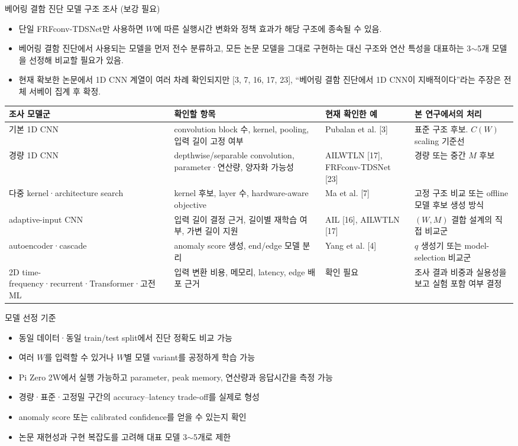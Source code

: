 \documentclass[10pt]{article}
\begin{document}
\noindent 베어링 결함 진단 모델 구조 조사 (보강 필요)
\begin{itemize}
\item 단일 FRFconv-TDSNet만 사용하면 $W$에 따른 실행시간 변화와 정책 효과가 해당 구조에 종속될 수 있음.
\item 베어링 결함 진단에서 사용되는 모델을 먼저 전수 분류하고, 모든 논문 모델을 그대로 구현하는 대신 구조와 연산 특성을 대표하는 3$\sim$5개 모델을 선정해 비교할 필요가 있음.
\item 현재 확보한 논문에서 1D CNN 계열이 여러 차례 확인되지만 [3, 7, 16, 17, 23], ``베어링 결함 진단에서 1D CNN이 지배적이다''라는 주장은 전체 서베이 집계 후 확정.
\end{itemize}
\begin{center}\scriptsize
\begin{tabular}{@{}L{2.6cm}L{4.0cm}L{3.2cm}L{4.5cm}@{}}
\toprule
조사 모델군 & 확인할 항목 & 현재 확인한 예 & 본 연구에서의 처리 \\ \midrule
기본 1D CNN & convolution block 수, kernel, pooling, 입력 길이 고정 여부 & Pubalan et al. [3] & 표준 구조 후보. $C(W)$ scaling 기준선 \\
경량 1D CNN & depthwise/separable convolution, parameter·연산량, 양자화 가능성 & AILWTLN [17], FRFconv-TDSNet [23] & 경량 또는 중간 $M$ 후보 \\
다중 kernel·architecture search & kernel 후보, layer 수, hardware-aware objective & Ma et al. [7] & 고정 구조 비교 또는 offline 모델 후보 생성 방식 \\
adaptive-input CNN & 입력 길이 결정 근거, 길이별 재학습 여부, 가변 길이 지원 & AIL [16], AILWTLN [17] & $(W,M)$ 결합 설계의 직접 비교군 \\
autoencoder·cascade & anomaly score 생성, end/edge 모델 분리 & Yang et al. [4] & $q$ 생성기 또는 model-selection 비교군 \\
2D time-frequency·recurrent·Transformer·고전 ML & 입력 변환 비용, 메모리, latency, edge 배포 근거 & 확인 필요 & 조사 결과 비중과 실용성을 보고 실험 포함 여부 결정 \\
\bottomrule
\end{tabular}
\end{center}
\noindent 모델 선정 기준
\begin{itemize}
\item 동일 데이터·동일 train/test split에서 진단 정확도 비교 가능
\item 여러 $W$를 입력할 수 있거나 $W$별 모델 variant를 공정하게 학습 가능
\item Pi Zero 2W에서 실행 가능하고 parameter, peak memory, 연산량과 응답시간을 측정 가능
\item 경량·표준·고정밀 구간의 accuracy--latency trade-off를 실제로 형성
\item anomaly score 또는 calibrated confidence를 얻을 수 있는지 확인
\item 논문 재현성과 구현 복잡도를 고려해 대표 모델 3$\sim$5개로 제한
\end{itemize}
\end{document}

